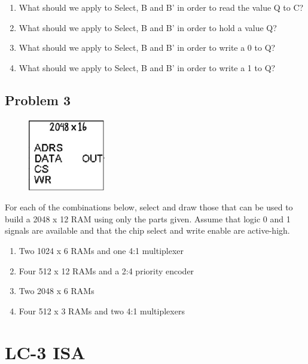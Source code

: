 \documentclass{article}
\begin{document}
\begin{enumerate}[label=\alph*.]
\item What should we apply to Select, B and B’ in order to read the value Q to C?
\item What should we apply to Select, B and B’ in order to hold a value Q?
\item What should we apply to Select, B and B’ in order to write a 0 to Q?
\item What should we apply to Select, B and B’ in order to write a 1 to Q?
\end{enumerate}

\newpage
\subsection*{Problem 3}
\begin{figure}[!h]
    \centering
    \includegraphics[width=0.3\textwidth]{figures/memory_q1.jpg}
\end{figure}
For each of the combinations below, select and draw those that can be used to build a 2048 x 12 RAM using only the parts given. Assume that logic 0 and 1 signals are available and that the chip select and write enable are active-high.

\begin{enumerate}[label=\alph*.]
\item Two 1024 x 6 RAMs and one 4:1 multiplexer
\item Four 512 x 12 RAMs and a 2:4 priority encoder
\item Two 2048 x 6 RAMs	
\item Four 512 x 3 RAMs and two 4:1 multiplexers
\end{enumerate}


\newpage
\section*{LC-3 ISA}
\end{document}
